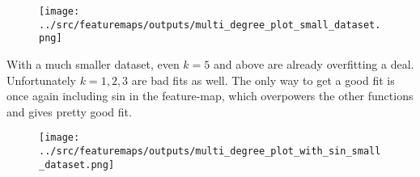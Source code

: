 %
%
\begin{answer}
\begin{figure}[H]
	\texttt{[image: ../src/featuremaps/outputs/multi\_degree\_plot\_small\_dataset.png]}
\end{figure}

With a much smaller dataset, even $k=5$ and above are already overfitting a deal. Unfortunately $k=1,2,3$ are bad fits as well. The only way to get a good fit is once again including sin in the feature-map, which overpowers the other functions and gives pretty good fit.
\begin{figure}[H]
	\texttt{[image: ../src/featuremaps/outputs/multi\_degree\_plot\_with\_sin\_small\_dataset.png]}
\end{figure}

\end{answer}
%